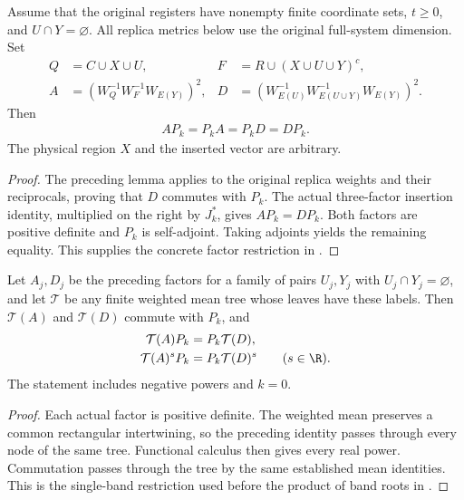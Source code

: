 \begin{theorem}
    \label{thm:bell_metric_factors_pin_action}
    \leanok
    Assume that the original registers have nonempty finite coordinate
    sets, $t\ge0$, and $U\cap Y=\varnothing$. All replica metrics below
    use the original full-system dimension. Set
    \begin{align*}
        Q&=C\cup X\cup U,&
        F&=R\cup(X\cup U\cup Y)^c,\\
        A&=(W_Q^{-1}W_F^{-1}W_{E(Y)})^2,&
        D&=(W_{E(U)}^{-1}W_{E(U\cup Y)}^{-1}W_{E(Y)})^2.
    \end{align*}
    Then
    \begin{align*}
        AP_k=P_kA=P_kD=DP_k.
    \end{align*}
    The physical region $X$ and the inserted vector are arbitrary.
\end{theorem}
\begin{proof}\leanok
    The preceding lemma applies to the original replica weights and their
    reciprocals, proving that $D$ commutes with $P_k$. The actual
    three-factor insertion identity, multiplied on the right by $J_k^*$,
    gives $AP_k=DP_k$. Both factors are positive definite and $P_k$ is
    self-adjoint. Taking adjoints yields the remaining equality. This
    supplies the concrete factor restriction in
    \cite[\texttt{07-comparators.tex}, lines 299--308]{OpenAI2026AreaLaw}.
\end{proof}

\begin{theorem}
    \label{thm:bell_mean_tree_pin_action}
    \leanok
    Let $A_j,D_j$ be the preceding factors for a family of pairs
    $U_j,Y_j$ with $U_j\cap Y_j=\varnothing$, and let $\mathcal T$ be
    any finite weighted mean tree whose leaves have these labels. Then
    $\mathcal T(A)$ and $\mathcal T(D)$ commute with $P_k$, and
    \begin{align*}
        \mathcal T(A)P_k&=P_k\mathcal T(D),\\
        \mathcal T(A)^sP_k&=P_k\mathcal T(D)^s\qquad(s\in\R).
    \end{align*}
    The statement includes negative powers and $k=0$.
\end{theorem}
\begin{proof}\leanok
    Each actual factor is positive definite. The weighted mean preserves
    a common rectangular intertwining, so the preceding identity passes
    through every node of the same tree. Functional calculus then gives
    every real power. Commutation passes through the tree by the same
    established mean identities. This is the single-band restriction
    used before the product of band roots in
    \cite[\texttt{07-comparators.tex}, lines 370--381]{OpenAI2026AreaLaw}.
\end{proof}
